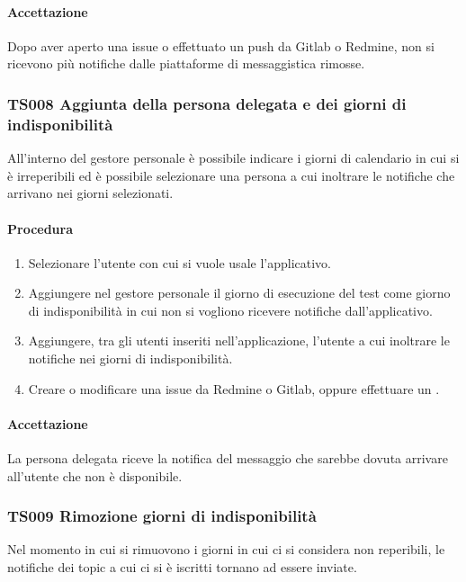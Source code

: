 		\paragraph*{Accettazione}
		Dopo aver aperto una issue o effettuato un push da Gitlab o Redmine, non si ricevono più notifiche dalle piattaforme di messaggistica rimosse.
		
	\subsubsection{TS008 Aggiunta della persona delegata e dei giorni di indisponibilità}
		All'interno del gestore personale è possibile indicare i giorni di calendario in cui si è irreperibili ed è possibile selezionare una persona a cui inoltrare le notifiche che arrivano nei giorni selezionati.
		
		\paragraph*{Procedura}
			\begin{enumerate}
				\item Selezionare l'utente con cui si vuole usale l'applicativo.
				\item Aggiungere nel gestore personale il giorno di esecuzione del test come giorno di indisponibilità in cui non si vogliono ricevere notifiche dall'applicativo.
				\item Aggiungere, tra gli utenti inseriti nell'applicazione, l'utente a cui inoltrare le notifiche nei giorni di indisponibilità.
				\item Creare o modificare una issue da Redmine o Gitlab, oppure effettuare un . 
			\end{enumerate}
		
		\paragraph*{Accettazione}
		La persona delegata riceve la notifica del messaggio che sarebbe dovuta arrivare all'utente che non è disponibile.
		
	\subsubsection{TS009 Rimozione giorni di indisponibilità}
		Nel momento in cui si rimuovono i giorni in cui ci si considera non reperibili, le notifiche dei topic a cui ci si è iscritti tornano ad essere inviate.
		
